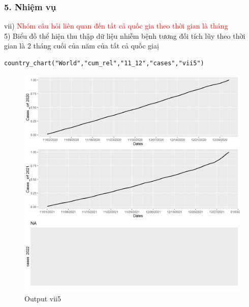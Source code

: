 \documentclass[english,10pt,table]{beamer}
\begin{document}
\begin{frame}[fragile]
\frametitle{5.  Nhiệm vụ}
vii) \textcolor{red}{Nhóm câu hỏi liên quan đến tất cả quốc gia theo thời gian là tháng }\\
    5) Biểu đồ thể hiện thu thập dữ liệu nhiễm bệnh tương đối tích lũy theo thời gian là 2 tháng cuối của năm của tất cả quốc giaị
\begin{lstlisting}[frame = single,basicstyle=\tiny]
country_chart("World","cum_rel","11_12","cases","vii5")
		\end{lstlisting}
			\begin{figure}[h!]
	\begin{center}
		    \includegraphics[scale = 0.23]{Images/VII/vii5 World .jpeg}
		     \caption{Output vii5}
		\end{center}
		\end{figure}
\end{frame}
\end{document}
